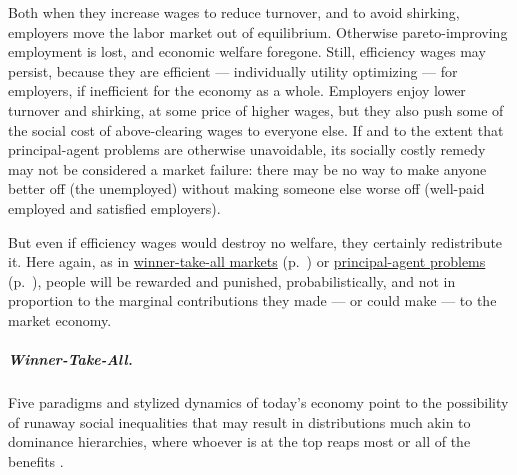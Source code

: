Both when they increase wages to reduce turnover, and to avoid shirking, employers move the labor market out of equilibrium. Otherwise pareto-improving employment is lost, and economic welfare foregone. Still, efficiency wages may persist, because they are efficient --- individually utility optimizing --- for employers, if inefficient for the economy as a whole. Employers enjoy lower turnover and shirking, at some price of higher wages, but they also push some of the social cost of above-clearing wages to everyone else. If and to the extent that principal-agent problems are otherwise unavoidable, its socially costly remedy may not be considered a market failure: there may be no way to make anyone better off (the unemployed) without making someone else worse off (well-paid employed and satisfied employers).

But even if efficiency wages would destroy no welfare, they certainly redistribute it. Here again, as in \hyperref[sec:winner-take-all]{winner-take-all markets} (p.~\pageref{sec:winner-take-all}) or \hyperref[sec:principal-agent-problem]{principal-agent problems} (p.~\pageref{sec:principal-agent-problem}), people will be rewarded and punished, probabilistically, and not in proportion to the marginal contributions they made --- or could make --- to the market economy.

\subparagraph[Winner-Take-All]{Winner-Take-All.}  \label{sec:winner-take-all} Five paradigms and stylized dynamics of today's economy point to the possibility of runaway social inequalities that may result in distributions much akin to dominance hierarchies, where whoever is at the top reaps most or all of the benefits \citep{Frank1996}.


